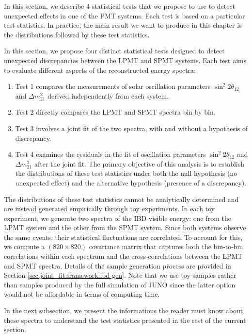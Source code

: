 \documentclass[../main.tex]{subfiles}
\begin{document}
In this section, we describe 4 statistical tests that we propose to use to detect unexpected effects in one of the PMT systems. Each test is based on a particular test statistics. In practice, the main result we want to produce in this chapter is the distributions followed by these test statistics.

In this section, we propose four distinct statistical tests designed to detect unexpected discrepancies between the LPMT and SPMT systems. Each test aims to evaluate different aspects of the reconstructed energy spectra:
\begin{enumerate}
  \item Test 1 compares the measurements of solar oscillation parameters $\sin^2{2 \theta_{12}}$ and $\Delta m^2_{21}$ derived independently from each system.
  \item Test 2 directly compares the LPMT and SPMT spectra bin by bin.
  \item Test 3 involves a joint fit of the two spectra, with and without a hypothesis of discrepancy.
  \item Test 4 examines the residuals in the fit of oscillation parameters $\sin^2{2 \theta_{12}}$ and $\Delta m^2_{21}$ after the joint fit. The primary objective of this analysis is to establish the distributions of these test statistics under both the null hypothesis (no unexpected effect) and the alternative hypothesis (presence of a discrepancy).
\end{enumerate}

The distributions of these test statistics cannot be analytically determined and are instead generated empirically through toy experiments. In each toy experiment, we generate two spectra of the IBD visible energy: one from the LPMT system and the other from the SPMT system. Since both systems observe the same events, their statistical fluctuations are correlated. To account for this, we compute a $(820 \times 820)$ covariance matrix that captures both the bin-to-bin correlations within each spectrum and the cross-correlations between the LPMT and SPMT spectra. Details of the sample generation process are provided in Section \ref{sec:joint_fit:framework:ibd-gen}.
Note that we use toy samples rather than samples produced by the full simulation of JUNO since the latter option would not be affordable in terms of computing time.

In the next subsection, we present the informations the reader must know about these spectra to understand the test statistics presented in the rest of the current section.
\end{document}
